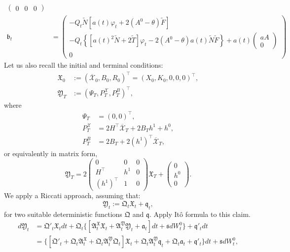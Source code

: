 \documentclass[11pt,twoside]{amsart}
\theoremstyle{definition}
\numberwithin{equation}{section}
\renewcommand{\bar}{\overline}
\begin{document}
\begin{align*}
\begin{pmatrix}
         0 & 0 & 0 
    \end{pmatrix}\\
    \mathfrak{b}_t   &=
    \begin{pmatrix}
        - Q_t \widetilde{N}\left[a(t) \varphi_t + 2(A^0-\theta) \widetilde{F} \right]\\
        - Q_t\left\{\left[a(t)^2 \widetilde{N} + 2 \widetilde{T}\right]\varphi_t - 2(A^0-\theta) a(t) \widetilde{N} \widetilde{F} \right\} + a(t)
        \begin{pmatrix}
            aA\\0
        \end{pmatrix}\\
        0
    \end{pmatrix}
\end{align*}
Let us also recall the initial and terminal conditions:
\begin{align*}
    \mathfrak{X}_0 &:= (\bar{\mathcal{X}}_0, B_0, R_0)^\top = (X_0, K_0, 0, 0, 0)^\top,\\
    \mathfrak{Y}_T &:= (\Psi_T, P^\mathcal{X}_T, P^B_T)^\top, 
\end{align*}
where
\begin{align*}
    \Psi_T &= (0, 0)^\top,\\ 
    P^\mathcal{X}_T &= 2H^\top \bar{\mathcal{X}}_T + 2B_T h^1 + h^0,\\
    P^B_T &= 2B_T + 2 (h^1)^\top \bar{\mathcal{X}}_T,
\end{align*}
or equivalently in matrix form,
\begin{equation*}
    \mathfrak{Y}_T = 2\begin{pmatrix}
        0 & 0 & 0\\
        H^\top & h^1 & 0\\ 
        (h^1)^\top & 1 & 0
    \end{pmatrix}
    \mathfrak{X}_T
    +
    \begin{pmatrix}
        0  \\
        h^0\\
        0
    \end{pmatrix}.
\end{equation*}
We apply a Riccati approach, assuming that: 
\begin{equation}
\label{eqn: ansatz mathfrak}
\mathfrak{Y}_t := \mathfrak{Q}_t\mathfrak{X}_t + \mathfrak{q}_t,
\end{equation}
for two suitable deterministic functions $\mathfrak{Q}$ and $\mathfrak{q}$. Apply It\^o formula to this claim. 
\begin{align*}
    d\mathfrak{Y}_t 
    &= \mathfrak{Q}'_t \mathfrak{X}_tdt + \mathfrak{Q}_t \{[\mathfrak{A}^{\mathfrak{X}}_t\mathfrak{X}_t + \mathfrak{A}^{\mathfrak{Y}}_t\mathfrak{Y}_t + \mathfrak{a}_t ] dt + \mathfrak{s} dW^0_t\} + \mathfrak{q}'_tdt\\
    &= \{[ \mathfrak{Q}'_t+ \mathfrak{Q}_t \mathfrak{A}^{\mathfrak{X}}_t + \mathfrak{Q}_t\mathfrak{A}^{\mathfrak{Y}}_t \mathfrak{Q}_t]\mathfrak{X}_t + \mathfrak{Q}_t \mathfrak{A}^{\mathfrak{Y}}_t\mathfrak{q}_t + \mathfrak{Q}_t\mathfrak{a}_t + \mathfrak{q}'_t\} dt + \mathfrak{s} dW^0_t,
\end{align*}
\end{document}
